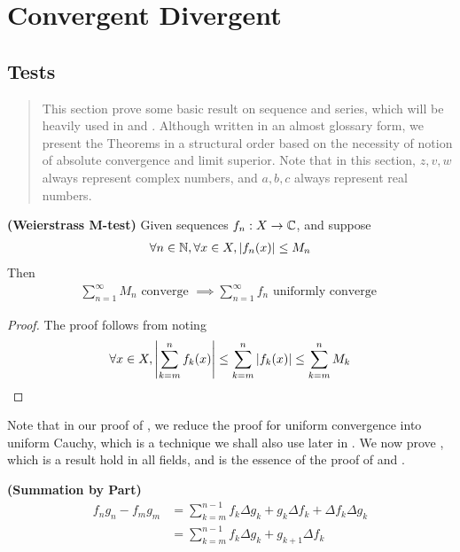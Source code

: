 \documentclass{report}
\begin{document}
\chapter{Convergent Divergent}
\section{Tests}
\label{Basic Technique on Sequence and Series}
\begin{abstract}
This section prove some basic result on sequence and series, which will be heavily used in  and . Although written in an almost glossary form, we present the Theorems in a structural order based on the necessity of notion of absolute convergence and limit superior. Note that in this section, $z,v,w$ always represent complex numbers, and $a,b,c$ always represent real numbers.  
\end{abstract}
\begin{theorem}
\label{WM-t}
\textbf{(Weierstrass M-test)} Given sequences $f_n:X\rightarrow \mathbb{C}$, and suppose 
\begin{align*}
\forall n\in\mathbb{N},\forall x\in X, \left|f_n(x)\right|\leq M_n
\end{align*}
Then 
\begin{align*}
\sum_{n=1}^\infty M_n\text{ converge }\implies \sum_{n=1}^\infty f_n\text{ uniformly converge }
\end{align*} 
\end{theorem}
\begin{proof}
The proof follows from noting 
\begin{align*}
  \forall x\in X, \left|\sum_{k=m}^n f_k(x)\right|\leq \sum_{k=m}^n \left|f_k(x)\right|\leq \sum_{k=m}^n M_k
\end{align*}
\end{proof}
\begin{mdframed}
  Note that in our proof of  , we reduce the proof for uniform convergence into uniform Cauchy, which is a technique we shall also use later in . We now prove , which is a result hold in all fields, and is the essence of the proof of  and . 
\end{mdframed}
\begin{theorem}
\label{Summation by Part}
\textbf{(Summation by Part)} 
\begin{align*}
  f_ng_n-f_mg_m&=\sum_{k=m}^{n-1}f_k \Delta g_k + g_k \Delta f_k+ \Delta f_k \Delta g_k \\
  &=\sum_{k=m}^{n-1}f_k \Delta g_k + g_{k+1}\Delta f_k
\end{align*}
\end{theorem}
\end{document}
